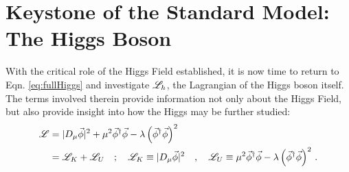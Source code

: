 \section{Keystone of the Standard Model: The Higgs Boson} \label{sec:higgs_boson}

    With the critical role of the Higgs Field established, it is now time to return to Eqn. \ref{eq:fullHiggs}
        and investigate $\mathscr{L}_h$, the Lagrangian of the Higgs boson itself.
    The terms involved therein provide information not only about the Higgs Field,
        but also provide insight into how the Higgs may be further studied:
    \begin{equation} \begin{split}
        \mathscr{L} &= |D_{\mu} \vec{\phi}|^2 +
            \mu^2 \vec{\phi}^\dag \vec{\phi} - \lambda \left( \vec{\phi}^\dag\vec{\phi} \right)^2
        \\&= \mathscr{L}_K + \mathscr{L}_U \quad ; \quad 
            \mathscr{L}_K \equiv |D_{\mu} \vec{\phi}|^2 \quad , \quad
            \mathscr{L}_U \equiv \mu^2 \vec{\phi}^\dag \vec{\phi} - \lambda \left( \vec{\phi}^\dag\vec{\phi} \right)^2
        \,.
    \end{split} \end{equation}
    

